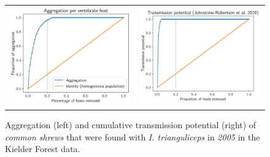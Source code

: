 \documentclass[hidelinks]{article}
\begin{document}
\begin{figure}[]
	\begin{mdframed}[backgroundcolor=grey250,rightline=false,leftline=false,topline=false]
	\centering
	\begin{tabular}{ll}
		\includegraphics[width=.48\linewidth,valign=m]{lorenz_aggregation_SA_2005_I.Trianguliceps} & \includegraphics[width=.48\linewidth,valign=m]{lorenz_JR_SA_2005_I.Trianguliceps} \\
	\end{tabular}
	\caption{Aggregation (left) and cumulative transmission potential (right) of \textit{common shrews} that were found with \textit{I. trianguliceps} in \textit{2005} in the Kielder Forest data.}
	\label{fig:lorenz_2005_itrianguliceps_SA}
	\end{mdframed}
\end{figure}
\end{document}
